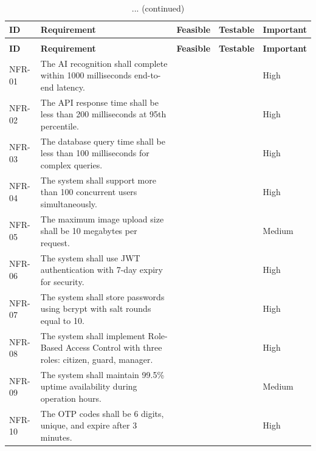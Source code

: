 \documentclass[a4paper]{article}
\newcommand{\cmark}{\ding{51}} %
\begin{document}
\begin{longtable}{@{}
    >{\raggedright\arraybackslash}p{}
    p{}
    >{\centering\arraybackslash}p{}
    >{\centering\arraybackslash}p{}
    >{\raggedright\arraybackslash}p{} @{}}

    \caption{Non-Functional Requirements}
    \label{tab:nonfunctional_requirements} \\

    \toprule
    \textbf{ID} & \textbf{Requirement} & \textbf{Feasible} & \textbf{Testable} & \textbf{Important} \\
    \midrule
    \endfirsthead

    \caption[]{... (continued)} \\
    \toprule
    \textbf{ID} & \textbf{Requirement} & \textbf{Feasible} & \textbf{Testable} & \textbf{Important} \\
    \midrule
    \endhead

    \bottomrule
    \endlastfoot

    NFR-01 & The AI recognition shall complete within 1000 milliseconds end-to-end latency. & \cmark & \cmark & High \\
    \addlinespace
    NFR-02 & The API response time shall be less than 200 milliseconds at 95th percentile. & \cmark & \cmark & High \\
    \addlinespace
    NFR-03 & The database query time shall be less than 100 milliseconds for complex queries. & \cmark & \cmark & High \\
    \addlinespace
    NFR-04 & The system shall support more than 100 concurrent users simultaneously. & \cmark & \cmark & High \\
    \addlinespace
    NFR-05 & The maximum image upload size shall be 10 megabytes per request. & \cmark & \cmark & Medium \\
    \addlinespace 
    NFR-06 & The system shall use JWT authentication with 7-day expiry for security. & \cmark & \cmark & High \\
    \addlinespace
    NFR-07 & The system shall store passwords using bcrypt with salt rounds equal to 10. & \cmark & \cmark & High \\
    \addlinespace
    NFR-08 & The system shall implement Role-Based Access Control with three roles: citizen, guard, manager. & \cmark & \cmark & High \\
    \addlinespace
    NFR-09 & The system shall maintain 99.5\% uptime availability during operation hours. & \cmark & \cmark & Medium \\
    \addlinespace
    NFR-10 & The OTP codes shall be 6 digits, unique, and expire after 3 minutes. & \cmark & \cmark & High \\
\end{longtable}
\end{document}
